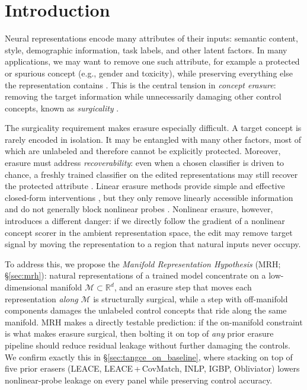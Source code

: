\section{Introduction}
\label{sec:intro}

Neural representations encode many attributes of their inputs: semantic content, style, demographic information, task labels, and other latent factors. In many applications, we may want to remove one such attribute, for example a protected or spurious concept (e.g., gender and toxicity), while preserving everything else the representation contains \citep{dearteaga-etal-2019-bias,avitan-etal-2025-practical}. This is the central tension in \textit{concept erasure}: removing the target information while unnecessarily damaging other control concepts, known as \textit{surgicality} \cite{singh-ravfogel-2024-representation-surgery}.

The surgicality requirement makes erasure especially difficult. A target concept is rarely encoded in isolation. It may be entangled with many other factors, most of which are unlabeled and therefore cannot be explicitly protected. Moreover, erasure must address \emph{recoverability}: even when a chosen classifier is driven to chance, a freshly trained classifier on the edited representations may still recover the protected attribute \citep{elazar-goldberg-2018-adversarial}. Linear erasure methods provide simple and effective closed-form interventions \citep{ravfogel-etal-2020-null,belrose-etal-2023-leace}, but they only remove linearly accessible information and do not generally block nonlinear probes \citep{ravfogel-etal-2022-adversarial}. Nonlinear erasure, however, introduces a different danger: if we directly follow the gradient of a nonlinear concept scorer in the ambient representation space, the edit may remove target signal by moving the representation to a region that natural inputs never occupy.

To address this, we propose the \emph{Manifold Representation Hypothesis} (MRH; §\ref{sec:mrh}): natural representations of a trained model concentrate on a low-dimensional manifold $\mathcal{M} \subset \mathbb{R}^d$, and an erasure step that moves each representation \emph{along} $\mathcal{M}$ is structurally surgical, while a step with off-manifold components damages the unlabeled control concepts that ride along the same manifold. MRH makes a directly testable prediction: if the on-manifold constraint is what makes erasure surgical, then bolting it on top of \emph{any} prior erasure pipeline should reduce residual leakage without further damaging the controls. We confirm exactly this in §\ref{sec:tangce_on_baseline}, where stacking \TanGCE{} on top of five prior erasers (LEACE, LEACE\,+\,CovMatch, INLP, IGBP, Obliviator) lowers nonlinear-probe leakage on every panel while preserving control accuracy.

